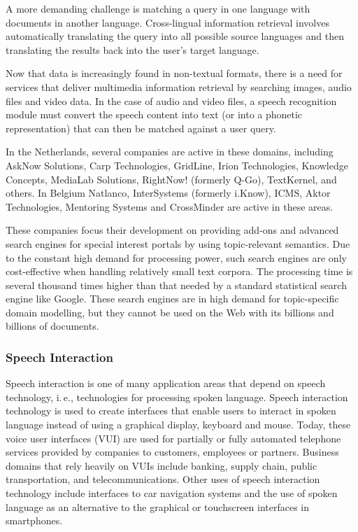 \documentclass[]{../../metanetpaper}
\begin{document}
\begin{multicols}{2}
A more demanding challenge is matching a query in one language with documents in another language. Cross-lingual information retrieval involves automatically translating the query into all possible source languages and then translating the results back into the user's target language.

Now that data is increasingly found in non-textual formats, there is a need for services that deliver multimedia information retrieval by searching images, audio files and video data. In the case of audio and video files, a speech recognition module must convert the speech content into text (or into a phonetic representation) that can then be matched against a user query.

 In the Netherlands, several companies are active in these domains, including AskNow Solutions, Carp Technologies, GridLine, Irion Technologies, Knowledge Concepts, MediaLab Solutions, RightNow! (formerly Q-Go), TextKernel, and others. In Belgium Natlanco, InterSystems (formerly i.Know), ICMS, Aktor Technologies, Mentoring Systems and CrossMinder are active in these areas.

These companies focus their development on providing add-ons and advanced search engines for special interest portals by using topic-relevant semantics. Due to the constant high demand for processing power, such search engines are only cost-effective when handling relatively small text corpora. The processing time is several thousand times higher than that needed by a standard statistical search engine like Google. These search engines are in high demand for topic-specific domain modelling, but they cannot be used on the Web with its billions and billions of documents.



\subsubsection{Speech Interaction}

Speech interaction is one of many application areas that depend on speech technology, i.\,e., technologies for processing spoken language. Speech interaction technology is used to create interfaces that enable users to interact in spoken language instead of using a graphical display, keyboard and mouse.  Today, these voice user interfaces (VUI) are used for partially or fully automated telephone services provided by companies to customers, employees or partners. Business domains that rely heavily on VUIs include banking, supply chain, public transportation, and telecommunications. Other uses of speech interaction technology include interfaces to car navigation systems and the use of spoken language as an alternative to the graphical or touchscreen interfaces in smartphones.


\end{multicols}
\end{document}
